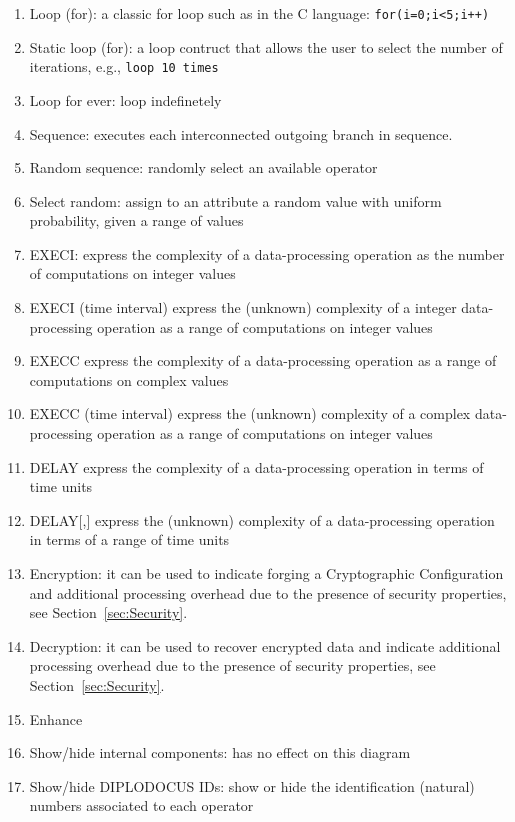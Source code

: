 \documentclass{llncs}
\begin{document}
\begin{enumerate}
	\item Loop (for): a classic for loop such as in the C language: \texttt{for(i=0;i<5;i++)}
	\item Static loop (for): a loop contruct that allows the user to select the number of iterations, e.g.,
	\texttt{loop 10 times}
	\item Loop for ever: loop indefinetely
	\item Sequence: executes each interconnected outgoing branch in sequence.
	\item Random sequence: randomly select an available operator
	\item Select random: assign to an attribute a random value with uniform probability, given a range of values
	\item EXECI: express the complexity of a data-processing operation as the number of computations on integer
	values
	\item EXECI (time interval) express the (unknown) complexity of a integer data-processing operation as a range
	of computations on integer values
	\item EXECC express the complexity of a data-processing operation as a range of computations on complex values
	\item EXECC (time interval) express the (unknown) complexity of a complex data-processing operation as a range
	of computations on integer values
	\item DELAY express the complexity of a data-processing operation in terms of time units
	\item DELAY[,] express the (unknown) complexity of a data-processing operation in terms of a range of time
	units
	\item Encryption: it can be used to indicate forging a Cryptographic Configuration and additional processing overhead due to the presence of security
	properties, see Section~\ref{sec:Security}.
	\item Decryption: it can be used to recover encrypted data and indicate additional processing overhead due to the presence of security
	properties, see Section~\ref{sec:Security}.
	\item Enhance
	\item Show/hide internal components: has no effect on this diagram
	\item Show/hide DIPLODOCUS IDs: show or hide the identification (natural) numbers associated to each operator
\end{enumerate}
%
\end{document}
